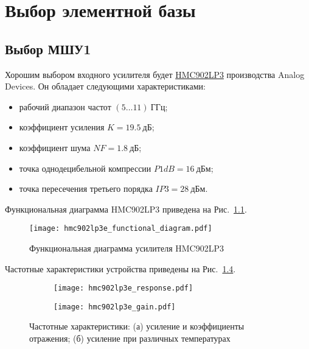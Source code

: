 \chapter{Выбор элементной базы}

\section{Выбор МШУ1}

Хорошим выбором входного усилителя будет \href{https://www.analog.com/en/products/hmc902lp3e.html}{HMC902LP3} производства Analog Devices.
Он обладает следующими характеристиками:
\begin{itemize}
    \item
        рабочий диапазон частот $(5 \ldots 11)~\text{ГГц}$;
    \item
        коэффициент усиления $K = 19.5~\text{дБ}$;
    \item
        коэффициент шума $NF = 1.8~\text{дБ}$;
    \item
        точка однодецибельной компрессии $P1dB = 16~\text{дБм}$;
    \item
        точка пересечения третьего порядка $IP3 = 28~\text{дБм}$.
\end{itemize}

Функциональная диаграмма HMC902LP3 приведена на Рис.~\ref{fig:hmc902lp3e_functional_diagram}.

\begin{figure}[!ht]
    \centering
    \texttt{[image: hmc902lp3e\_functional\_diagram.pdf]}
    \caption{Функциональная диаграмма усилителя HMC902LP3}%
    \label{fig:hmc902lp3e_functional_diagram}
\end{figure}

Частотные характеристики устройства приведены на Рис.~\ref{fig:hmc902lp3e_responses}.

\begin{figure}[!ht]
    \centering
    \begin{subfigure}[b]{0.45\textwidth}
        \centering
        \texttt{[image: hmc902lp3e\_response.pdf]}
        \caption{}%
        \label{fig:hmc902lp3e_response}
    \end{subfigure}
    \hfill
    \begin{subfigure}[b]{0.45\textwidth}
        \centering
        \texttt{[image: hmc902lp3e\_gain.pdf]}
        \caption{}%
        \label{fig:hmc902lp3e_gain}
    \end{subfigure}
    \caption{%
        Частотные характеристики:
        (а) усиление и коэффициенты отражения;
        (б) усиление при различных температурах
    }%
    \label{fig:hmc902lp3e_responses}
\end{figure}

